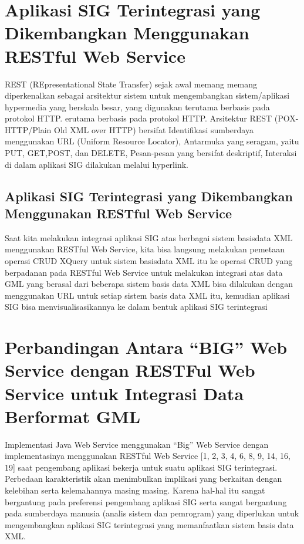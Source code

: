 \section{Aplikasi SIG Terintegrasi yang Dikembangkan Menggunakan RESTful Web Service}
REST (REpresentational State Transfer) sejak awal memang memang diperkenalkan sebagai arsitektur sistem untuk mengembangkan sistem/aplikasi hypermedia yang berskala besar, yang digunakan terutama berbasis pada protokol HTTP. erutama berbasis pada protokol HTTP. Arsitektur REST (POX-HTTP/Plain Old XML over HTTP) bersifat Identifikasi sumberdaya menggunakan URL
(Uniform Resource Locator), Antarmuka yang seragam, yaitu PUT, GET,POST, dan DELETE, Pesan-pesan yang bersifat deskriptif, Interaksi di dalam aplikasi SIG dilakukan melalui hyperlink.
\subsection{Aplikasi SIG Terintegrasi yang Dikembangkan Menggunakan RESTful Web Service}
Saat kita melakukan integrasi aplikasi SIG atas berbagai sistem basisdata XML menggunakan RESTful Web Service, kita bisa langsung melakukan pemetaan operasi CRUD XQuery untuk sistem basisdata XML itu ke operasi CRUD yang berpadanan pada RESTful Web Service 
untuk melakukan integrasi atas data GML yang berasal dari beberapa sistem basis data XML bisa dilakukan dengan menggunakan URL untuk setiap sistem basis data XML itu, kemudian aplikasi SIG bisa menvisualisasikannya ke dalam bentuk aplikasi SIG terintegrasi


\section{Perbandingan Antara “BIG” Web Service dengan RESTFul Web Service untuk Integrasi Data Berformat GML}
Implementasi Java Web Service menggunakan “Big” Web Service dengan implementasinya menggunakan RESTful Web Service [1, 2, 3, 4, 6, 8, 9, 14, 16, 19] saat pengembang aplikasi bekerja untuk suatu aplikasi SIG terintegrasi. Perbedaan karakteristik akan menimbulkan implikasi yang berkaitan dengan kelebihan serta kelemahannya masing masing. Karena hal-hal itu sangat bergantung pada preferensi pengembang aplikasi SIG serta sangat bergantung pada sumberdaya manusia (analis sistem dan pemrogram) yang diperlukan untuk mengembangkan aplikasi SIG terintegrasi yang memanfaatkan sistem basis data XML.
